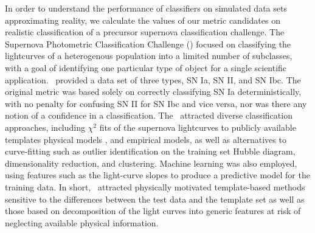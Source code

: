 
In order to understand the performance of classifiers on simulated data sets approximating reality, we calculate the values of our metric candidates on realistic classification of a precursor supernova classification challenge.
The Supernova Photometric Classification Challenge (\snphotcc) \citep{kessler_supernova_2010} focused on classifying the lightcurves of a heterogenous population into a limited number of subclasses, with a goal of identifying one particular type of object for a single scientific application.
\snphotcc\ provided a data set of three types, SN Ia, SN II, and SN Ibc.
The original metric was based solely on correctly classifying SN Ia deterministically, with no penalty for confusing SN II for SN Ibc and vice versa, nor was there any notion of a confidence in a classification.
The \snphotcc\ attracted diverse classification approaches, including $\chi^{2}$ fits of the supernova lightcurves to publicly available templates \citep{2002PASP..114..803N} physical models \citep{2008ApJ...681..482C}, and empirical models, as well as alternatives to curve-fitting such as outlier identification on the training set Hubble diagram, dimensionality reduction, and clustering.
Machine learning was also employed, using features such as the light-curve slopes to produce a predictive model for the training data.
In short, \snphotcc\ attracted physically motivated template-based methods sensitive to the differences between the test data and the template set as well as those based on decomposition of the light curves into generic features at risk of neglecting available physical information.
